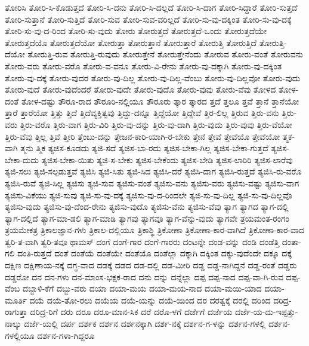 {ತೋರಿಸಿ
ತೋರಿ-ಸಿ-ಕೊಡುತ್ತದೆ
ತೋರಿ-ಸಿ-ದನು
ತೋರಿ-ಸಿ-ದಲ್ಲದೆ
ತೋರಿ-ಸಿ-ದಾಗ
ತೋರಿ-ಸಿದ್ದಾರೆ
ತೋರಿ-ಸುತ್ತದೆ
ತೋರಿ-ಸುತ್ತಾನೆ
ತೋರಿ-ಸುತ್ತಿದೆ
ತೋರಿ-ಸುವ
ತೋರಿ-ಸುವ-ವರಿಲ್ಲದೆ
ತೋರಿ-ಸು-ವು-ದಕ್ಕಿಂತ
ತೋರಿ-ಸು-ವು-ದಕ್ಕೆ
ತೋರಿ-ಸು-ವು-ದ-ರಿಂದ
ತೋರಿ-ಸು-ವುದು
ತೋರು
ತೋರುತ್ತದೆ
ತೋರುತ್ತದೆ-ಒಂದು
ತೋರುತ್ತದೆಯೇ
ತೋರುತ್ತದೆಯೊ
ತೋರುತ್ತದೆಯೋ
ತೋರುತ್ತಾ
ತೋರುತ್ತಾನೆ
ತೋರುತ್ತಾರೆ
ತೋರುತ್ತಿ
ತೋರುತ್ತಿದೆ
ತೋರುತ್ತಿ-ದೆಯೋ
ತೋರುತ್ತಿ-ರುವ
ತೋರುತ್ತಿ-ರುವುದು
ತೋರುತ್ತೇನೆ
ತೋರುತ್ತೇನೆಂದು
ತೋರುವ
ತೋರು-ವಂತೆ
ತೋರುವನು
ತೋರು-ವರು
ತೋರು-ವರೊ
ತೋರು-ವ-ವನೂ
ತೋರು-ವಿ-ರೇನು
ತೋರು-ವು-ದಕ್ಕಾಗಿ
ತೋರು-ವು-ದಕ್ಕಿಂತ
ತೋರು-ವು-ದಕ್ಕೆ
ತೋರು-ವುದರ
ತೋರು-ವು-ದಿಲ್ಲ
ತೋರು-ವು-ದಿಲ್ಲ-ವೆಂಬು
ತೋರು-ವು-ದಿಲ್ಲವೋ
ತೋರು-ವುದು
ತೋರು-ವುದೆ
ತೋರು-ವುದೆಂದರೆ
ತೋರು-ವುದೇ
ತೋರು-ವುದೊ
ತೋರು-ವುವು
ತೋರು-ವೆವು
ತೋಳದ
ತೋಳ-ದಂತೆ
ತೋಳ-ದಷ್ಟು
ತೌರೂ-ರಾದ
ತೌರೂರಿ-ನಲ್ಲಿಯೂ
ತೌರೂರು
ತ್ಕಾರ
ತ್ಕಾರದ
ತ್ತದೆ
ತ್ತಲೂ
ತ್ತವೆ
ತ್ತಾನೆ
ತ್ತಾನೆಯೋ
ತ್ತಾರೆ
ತ್ತಾರೆಯೋ
ತ್ತಿತ್ತು
ತ್ತಿದೆ
ತ್ತಿದೆವ್ಯಕ್ತಿತ್ವವು
ತ್ತಿದ್ದು-ದನ್ನೂ
ತ್ತಿದ್ದೆಯೋ
ತ್ತಿದ್ದೇವೆ
ತ್ತಿರ-ಲಿಲ್ಲ
ತ್ತಿರುವ
ತ್ತಿರು-ವನು
ತ್ತಿರು-ವರು
ತ್ತಿರು-ವರೊ
ತ್ತಿರು-ವಾಗ
ತ್ತಿರು-ವಿರಿ
ತ್ತಿರು-ವು-ದನ್ನು
ತ್ತಿರು-ವು-ದಾಗಿ
ತ್ತಿರು-ವುದು
ತ್ತಿರು-ವುವು
ತ್ತಿರು-ವೆಯೋ
ತ್ತಿರು-ವೆವು
ತ್ತಿಲ್ಲ
ತ್ತಿವೆ
ತ್ತೀರಿ
ತ್ತೆಂಬು-ದನ್ನು
ತ್ತೇಜನ-ಕಾರಿ-ಯಾಗಿ-ರ-ಬೇಕು
ತ್ತೇನೆ
ತ್ತೇವೆ
ತ್ತೇವೆಯೊ
ತ್ತೇವೆಯೋ
ತ್ಮಕ-ವಾಗಿ
ತ್ಮನು
ತ್ಮಿಕ
ತ್ಯಜಿಸ-ಕೂಡದು
ತ್ಯಜಿ-ಸದೆ
ತ್ಯಜಿಸ-ಬಾ-ರದು
ತ್ಯಜಿಸ-ಬೇಕಾ-ಗಿಲ್ಲ
ತ್ಯಜಿಸ-ಬೇಕಾ-ಗುತ್ತದೆ
ತ್ಯಜಿಸ-ಬೇಕಾ-ದುದು
ತ್ಯಜಿಸ-ಬೇಕಾ-ಯಿತು
ತ್ಯಜಿ-ಸ-ಬೇಕು
ತ್ಯಜಿಸ-ಬೇಕೆಂದು
ತ್ಯಜಿಸ-ಬೇಡಿ
ತ್ಯಜಿಸ-ಲಾರಿರಿ
ತ್ಯಜಿಸ-ಲಾರೆವು
ತ್ಯಜಿ-ಸಲು
ತ್ಯಜಿ-ಸಲ್ಪಡುತ್ತವೆ
ತ್ಯಜಿಸಿ
ತ್ಯಜಿ-ಸಿತು
ತ್ಯಜಿ-ಸಿದ
ತ್ಯಜಿಸಿ-ದರೆ
ತ್ಯಜಿಸಿ-ದಾಗ
ತ್ಯಜಿಸಿ-ರುತ್ತದೆ
ತ್ಯಜಿಸಿ-ರು-ವರೊ
ತ್ಯಜಿಸಿ-ರುವೆ
ತ್ಯಜಿ-ಸಿಲ್ಲ
ತ್ಯಜಿಸು
ತ್ಯಜಿ-ಸುವ
ತ್ಯಜಿಸು-ವಂತೆ
ತ್ಯಜಿಸು-ವನು
ತ್ಯಜಿಸು-ವರು
ತ್ಯಜಿಸು-ವಷ್ಟು
ತ್ಯಜಿಸು-ವಾಗ
ತ್ಯಜಿಸು-ವಿಕೆಯು
ತ್ಯಜಿ-ಸುವು
ತ್ಯಜಿ-ಸು-ವು-ದಕ್ಕೆ
ತ್ಯಜಿಸು-ವು-ದ-ರಿಂದಲೇ
ತ್ಯಜಿ-ಸು-ವು-ದಿಲ್ಲ
ತ್ಯಜಿ-ಸು-ವು-ದಿಲ್ಲವೊ
ತ್ಯಜಿಸು-ವುದು
ತ್ಯಜಿಸು-ವು-ದೆಂದ-ರೇನು
ತ್ಯಜಿಸು-ವುದೊ
ತ್ಯಜಿಸು-ವೆನು
ತ್ಯಜಿಸು-ವೆವು
ತ್ಯಾಗ
ತ್ಯಾಗದ
ತ್ಯಾಗ-ದಲ್ಲಿ
ತ್ಯಾಗ-ದಲ್ಲಿದೆ
ತ್ಯಾಗ-ಮಾ-ಡಲಿ
ತ್ಯಾಗ-ಮಾಡಿ
ತ್ಯಾಗವು
ತ್ಯಾಗವೂ
ತ್ಯಾಗ-ವೆನ್ನು-ವುದು
ತ್ಯಾಗವೇ
ತ್ರಯಮಂತ-ರಂಗಂ
ತ್ರಯಮೇಕತ್ರ
ತ್ರಿಕಾಲಜ್ಞಾನ-ಗಳು
ತ್ರಿಕಾಲ-ದಲ್ಲಿಯೂ
ತ್ರಿಕಾಶ್ಥಿ
ತ್ರಿಕೋಣಾ
ತ್ರಿಕೋಣಾ-ಕಾರ-ವಾಗಿದೆ
ತ್ರಿಕೋಣಾ-ಕಾರ-ವಾದ
ತ್ವರಿ-ತ-ವಾಗಿ
ತ್ವರಿ-ತವೂ
ಥಾಮಸ್
ದಂಗೆ
ದಂಗೆ-ಗಾರ
ದಂಗೆ-ಗಾರರು
ದಂಟನ್ನೇ
ದಂಡ-ವನ್ನು
ದಂಡಿ
ದಂಡೆತ್ತಿ
ದಂತಾ-ಗಲಿ
ದಂತಿ-ರುತ್ತದೆ
ದಂತೆ
ದಂತೆಯೆ
ದಂತೆಯೇ
ದಂತೆಯೊ
ದಂತೆಲ್ಲಾ
ದಕ್ಕಾಗಿ
ದಕ್ಕಿಂತ
ದಕ್ಕು-ವುದೆಂದೇ
ದಕ್ಕೂ
ದಕ್ಕೆ
ದಕ್ಷಿಣ
ದಕ್ಷಿಣಾಯ-ನಕ್ಕೆ
ದಗ್ಧ-ವಾದ
ದಡಕ್ಕೆ
ದಡದ
ದಡ-ದಲ್ಲಿ
ದಡ-ಮೀರಿ
ದಡ್ಡ
ದಡ್ಡ-ನಾಗಿದ್ದನೆ
ದಡ್ಡ-ರಂತೆ
ದಡ್ಡರು
ದಡ್ಡರೋ
ದನ
ದನ-ಗಳು
ದನ-ಮಾಂಸ-ಭಕ್ಷಕ-ರಾದ
ದನು
ದನ್ನು
ದನ್ನೆಲ್ಲಾ
ದಪ್ಪ
ದಪ್ಪ-ನಾದ
ದಪ್ಪ-ವಾ-ಗಿ-ರುವ
ದಪ್ಪ-ವೆಂಬ
ದಬ್ಬಾಳಿ-ಕೆಗೆ
ದಬ್ಬು-ವರು
ದಯಾ
ದಯಾ-ಮಯ
ದಯಾ-ಮಯ-ನಾದ
ದಯಾ-ಮಯಿ-ಯಾದ
ದಯಾ-ಮೂರ್ತಿ
ದಯೆ
ದಯೆ-ತೋ-ರಲು
ದಯೆಯ
ದಯೆ-ಯನ್ನು
ದಯೆ-ಯಿಂದ
ದರ
ದರತ್ವಕ್ಕೆ
ದರಲ್ಲಿ
ದರಿಂದ
ದರಿದ್ರ-ರಾಗುತ್ತಾ
ದರಿದ್ರ-ರಿಗೆ
ದರು
ದರೂ
ದರೂ-ಮಾನ-ಸಿಕ
ದರೆ
ದರೊ-ಳಗೆ
ದರ್ಜೆಗೆ
ದರ್ಜೆಯ
ದರ್ಜೆ-ಯ-ದು-ಇಪ್ಪತ್ತು-ನಾಲ್ಕು
ದರ್ಜೆ-ಯಲ್ಲಿ
ದರ್ಪ
ದರ್ಶಕ
ದರ್ಶನ
ದರ್ಶನಕ್ಕಾಗಿ
ದರ್ಶ-ನಕ್ಕೆ
ದರ್ಶನ-ಗ-ಳನ್ನು
ದರ್ಶನ-ಗಳಲ್ಲಿ
ದರ್ಶನ-ಗಳಲ್ಲಿಯೂ
ದರ್ಶನ-ಗಳಾ-ಗಿದ್ದರೂ
}
